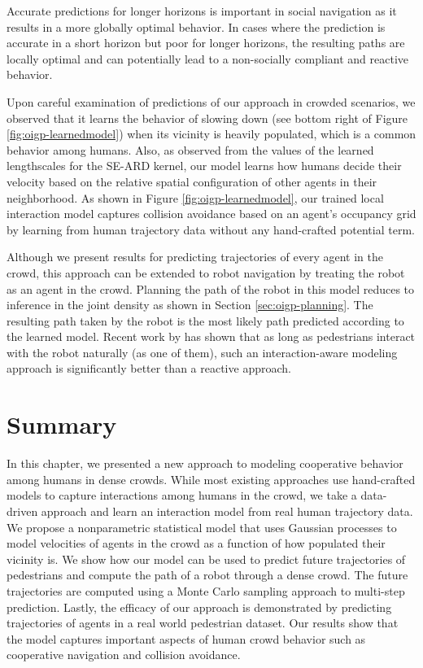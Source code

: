 Accurate predictions for longer horizons is important in social navigation
as it results in a more globally optimal behavior. In cases where the
prediction is accurate in a short horizon but poor for longer horizons,
the resulting paths are locally optimal and can potentially lead to a
non-socially compliant and reactive behavior.

Upon careful examination of predictions of our approach in crowded
scenarios, we observed that it learns the behavior of slowing down
(see bottom right of Figure \ref{fig:oigp-learnedmodel}) when its vicinity
is heavily populated, which is a common behavior among humans. Also,
as observed from the values of the learned lengthscales for the SE-ARD
kernel, our model learns how humans decide their velocity based on the
relative spatial configuration of other agents in their
neighborhood. As shown in Figure \ref{fig:oigp-learnedmodel}, our trained
local interaction model captures collision avoidance based on an
agent's occupancy grid by learning from human trajectory data without
any hand-crafted potential term.

Although we present results for predicting trajectories of every
agent in the crowd, this approach can be extended to robot navigation by
treating the robot as an agent in the crowd. Planning the path of the
robot in this model reduces to inference in the joint density as shown
in Section \ref{sec:oigp-planning}. The resulting path taken by the robot
is the most likely path predicted according to the learned
model. Recent work by \cite{pfeiffer16} has shown that as long as
pedestrians interact with the robot naturally (as one of them), such
an interaction-aware modeling approach is significantly better than a
reactive approach.


\section{Summary}
\label{sec:oigp-conclusion}

In this chapter, we presented a new approach to modeling cooperative
behavior among humans in dense crowds. While most existing approaches
use hand-crafted models to capture interactions among humans in the
crowd, we take a data-driven approach and learn an interaction model
from real human trajectory data. We propose a nonparametric
statistical model that uses Gaussian processes to model velocities of
agents in the crowd as a function of how populated their vicinity
is. We show how our model can be used to predict future trajectories
of pedestrians and compute the path of a robot through a dense
crowd. The future trajectories are computed using a Monte Carlo
sampling approach to multi-step prediction. Lastly, the efficacy of
our approach is demonstrated by predicting trajectories of agents in a
real world pedestrian dataset. Our results show that the model
captures important aspects of human crowd behavior such as cooperative
navigation and collision avoidance.


